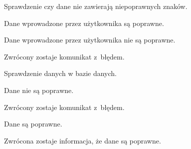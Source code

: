 \documentclass[12pt,a4paper]{article} %
\begin{document}
\hfill \break
\begin{usecase}
	\noaka
	\addpath
	\begin{usecases}
		\item Sprawdzenie czy dane nie zawierają niepoprawnych znaków.
		\item Dane wprowadzone przez użytkownika są poprawne.
		\begin{usecases}
			\item Dane wprowadzone przez użytkownika nie są poprawne.
			\begin{usecases}
				\item Zwrócony zostaje komunikat z~błędem.
			\end{usecases}
		\end{usecases}
		\item Sprawdzenie danych w bazie danych.
		\begin{usecases}
			\item Dane nie są poprawne.
			\begin{usecases}
				\item Zwrócony zostaje komunikat z~błędem.
			\end{usecases}
		\end{usecases}
		\item Dane są poprawne.
		\item Zwrócona zostaje informacja, że dane są poprawne.
	\end{usecases}
\end{usecase}
\end{document}
